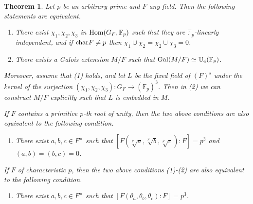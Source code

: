 \documentclass[12pt,leqno]{amsart}
\theoremstyle{plain}
\newtheorem{thm}{Theorem}[section]
\theoremstyle{definition}
\newcommand{\F}{{\mathbb F}}
\newcommand{\U}{{\mathbb U}}
\begin{document}
\begin{thm}
\label{thm:U4}
 Let $p$ be an arbitrary prime and  $F$ any field. Then the following statements are equivalent. 
 \begin{enumerate}
 \item There exist $\chi_1,\chi_2,\chi_3$ in ${\rm Hom}(G_F,\F_p)$ such that they are $\F_p$-linearly independent, and if ${\rm char} F\not=p$ then $\chi_1 \cup \chi_2 = \chi_2 \cup \chi_3 =0$.
  \item There exists a Galois extension $M/F$ such that ${\rm Gal}(M/F)\simeq \U_4(\F_p)$.
\end{enumerate}
Moreover, assume that (1) holds, and let $L$ be the fixed field of $(F)^s$ under the kernel of the surjection $(\chi_1,\chi_2,\chi_3)\colon G_{F}\to (\F_p)^3$. Then 
in (2) we can construct  $M/F$ explicitly such that  $L$ is embedded in $M$.

If $F$ contains a primitive $p$-th root of unity, then the two above conditions are also equivalent to the following condition.
\begin{enumerate}
\item[(3)] There exist $a,b,c\in F^\times$ such that $[F(\sqrt[p]{a},\sqrt[p]{b}, \sqrt[p]{c}):F]=p^3$ and $(a,b)=(b,c)=0$.
\end{enumerate}
If $F$ of characteristic $p$, then the two above conditions (1)-(2) are also equivalent to the following condition.
\begin{enumerate}
\item[(3')] There exist $a,b,c\in F^\times$ such that $[F(\theta_{a},\theta_{b}, \theta_{c}):F]=p^3$.
\end{enumerate}
 \end{thm}
\end{document}
